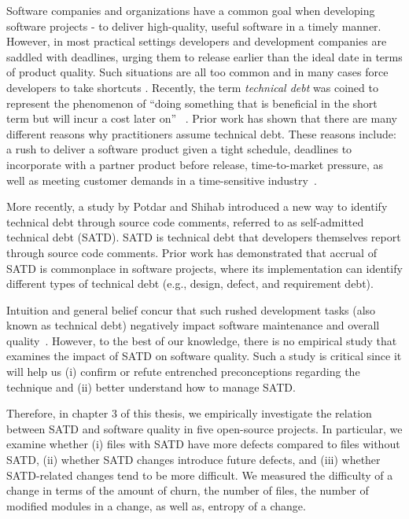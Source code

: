 
Software companies and organizations have a common goal when developing software projects - to deliver high-quality, useful software in a timely manner. However, in most practical settings developers and development companies are saddled with deadlines, urging them to release earlier than the ideal date in terms of product quality. Such situations are all too common and in many cases force developers to take shortcuts \cite{kruchten2013technical} \cite{seaman2015technical}. Recently, the term \emph{technical debt} was coined to represent the phenomenon of ``doing something that is beneficial in the short term but will incur a cost later on''~ \cite{cunningham1993wycash}. Prior work has shown that there are many different reasons why practitioners assume technical debt. These reasons include: a rush to deliver a software product given a tight schedule, deadlines to incorporate with a partner product before release, time-to-market pressure, as well as meeting customer demands in a time-sensitive industry~\cite{lim2012balancing}.


More recently, a study by Potdar and Shihab \cite{ICSM_PotdarS14} introduced a new way to identify technical debt through source code comments, referred to as self-admitted technical debt (SATD). SATD is technical debt that developers themselves report through source code comments. Prior work \cite{MTD15p9} has demonstrated that accrual of SATD is commonplace in software projects, where its implementation can identify different types of technical debt (e.g., design, defect, and requirement debt).\par

Intuition and general belief concur that such rushed development tasks (also known as technical debt) negatively impact software maintenance and overall quality~\cite{zazworka2011investigating,spinola2013investigating,GuoSGCTSSS11,seaman2015technical,kruchten2013technical}. However, to the best of our knowledge, there is no empirical study that examines the impact of SATD on software quality. Such a study is critical since it will help us (i) confirm or refute entrenched preconceptions regarding the technique and (ii) better understand how to manage SATD.\par

Therefore, in chapter 3 of this thesis, we empirically investigate the relation between SATD and software quality in five open-source projects. In particular, we examine whether (i) files with SATD have more defects compared to files without SATD, (ii) whether SATD changes introduce future defects, and (iii) whether SATD-related changes tend to be more difficult. We measured the difficulty of a change in terms of the amount of churn, the number of files, the number of modified modules in a change, as well as, entropy of a change. \par

